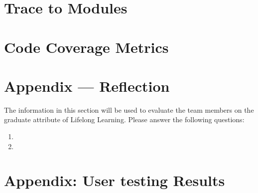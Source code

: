 \documentclass[12pt, titlepage]{article}
\begin{document}
\section{Trace to Modules}		

\section{Code Coverage Metrics}




\newpage{}
\section*{Appendix --- Reflection}

The information in this section will be used to evaluate the team members on the
graduate attribute of Lifelong Learning.  Please answer the following questions:

\begin{enumerate}
  \item 
  \item 
\end{enumerate}

\newpage{}
\section{Appendix: User testing Results}
\end{document}
